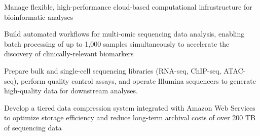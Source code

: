 \item Manage flexible, high-performance cloud-based computational infrastructure for bioinformatic analyses
\item Build automated workflows for multi-omic sequencing data analysis, enabling batch processing of up to 1,000
  samples simultaneously to accelerate the discovery of clinically-relevant biomarkers
\item Prepare bulk and single-cell sequencing libraries (RNA-seq, ChIP-seq, ATAC-seq), perform quality control assays,
  and operate Illumina sequencers to generate high-quality data for downstream analyses.
\item Develop a tiered data compression system integrated with Amazon Web Services
  to optimize storage efficiency and reduce long-term archival costs of over 200 TB of sequencing data
